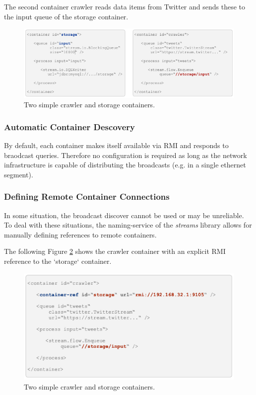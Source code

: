 The second container {\ttfamily crawler} reads data items from Twitter
and sends these to the input queue of the {\ttfamily storage}
container.

\begin{figure}
  \begin{center}
    \includegraphics[scale=0.5]{graphics/crawler-storage.png}
  \end{center}
  \caption{\label{fig:crawler-storage} Two simple crawler and storage containers.}
\end{figure}

\subsubsection{Automatic Container Descovery}

By default, each container makes itself available via RMI and responds
to braodcast queries. Therefore no configuration is required as long
as the network infrastructure is capable of distributing the
broadcasts (e.g. in a single ethernet segment).


\subsubsection{Defining Remote Container Connections}

In some situation, the broadcast discover cannot be used or may be
unreliable. To deal with these situations, the naming-service of the
{\em streams} library allows for manually defining references to remote
containers.

The following Figure \ref{fig:container-ref} shows the {\ttfamily
  crawler} container with an explicit RMI reference to the `storage`
container.

\begin{figure}
  \begin{center}
    \includegraphics[scale=0.5]{graphics/crawler-explicit-ref.png}
  \end{center}
  \caption{\label{fig:container-ref}Two simple crawler and storage containers.}
\end{figure}
